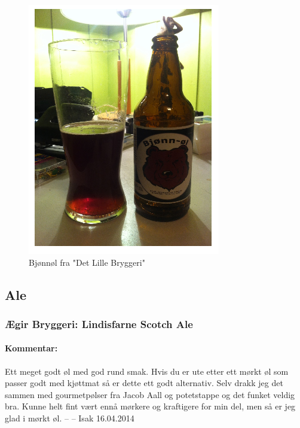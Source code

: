 \documentclass[12pt,a4paper,oneside,norsk]{article}
\begin{document}
\begin{figure} [H]
\centering
\includegraphics[scale=1.00]{Bilder/Ol/bjonnol.PNG} %
\caption{Bjønnøl fra "Det Lille Bryggeri"}
\end{figure}

\newpage
\subsection{Ale}

\subsubsection{Ægir Bryggeri: Lindisfarne Scotch Ale}
\paragraph{Kommentar:}Ett meget godt øl med god rund smak. Hvis du er ute etter ett mørkt øl som passer godt med kjøttmat så er dette ett godt alternativ. Selv drakk jeg det sammen med gourmetpølser fra Jacob Aall og potetstappe og det funket veldig bra. Kunne helt fint vært ennå mørkere og kraftigere for min del, men så er jeg glad i mørkt øl.  
\newline
-- -- Isak 16.04.2014
\end{document}
